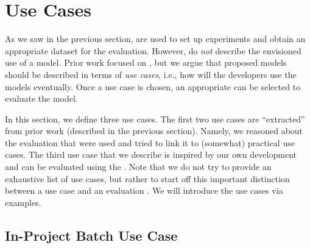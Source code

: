 \section{Use Cases}
\label{sec:use:cases}

As we saw in the previous section, \methodologies are used to set up
experiments and obtain an appropriate dataset for the evaluation.
However, \methodologies do \emph{not} describe the envisioned use of a
model.  Prior work focused on \methodologies, but we argue that
proposed models should be described in terms of \emph{use cases},
i.e., how will the developers use the models eventually.  Once a use
case is chosen, an appropriate \methodology can be selected to
evaluate the model.


In this section, we define three use cases.  The first two use cases
are ``extracted'' from prior work (described in the previous section).
Namely, we reasoned about the evaluation \methodologies that were used
and tried to link it to (somewhat) practical use cases.  The third use
case that we describe is inspired by our own development and can be
evaluated using the \evoaware \methodology.  Note that we do not try
to provide an exhaustive list of use cases, but rather to start off
this important distinction between a use case and an evaluation
\methodology.  We will introduce the use cases via examples.



\subsection{In-Project Batch Use Case}

